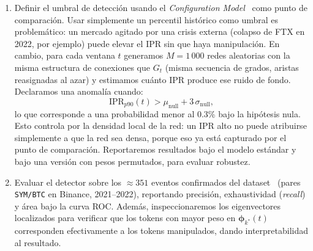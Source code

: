 \begin{enumerate}
  \item Definir el umbral de detección usando el \emph{Configuration
        Model}~\cite{newman2003} como punto de comparación. Usar simplemente
        un percentil histórico como umbral es problemático: un mercado agitado
        por una crisis externa (colapso de FTX en 2022, por ejemplo) puede
        elevar el IPR sin que haya manipulación. En cambio, para cada ventana
        $t$ generamos $M = 1\,000$ redes aleatorias con la misma estructura de
        conexiones que $G_t$ (misma secuencia de grados, aristas reasignadas al
        azar) y estimamos cuánto IPR produce ese ruido de fondo. Declaramos
        una anomalía cuando:
        \begin{equation}
          \mathrm{IPR}_{p90}(t) > \mu_{\text{null}} + 3\,\sigma_{\text{null}},
          \label{eq:threshold}
        \end{equation}
        lo que corresponde a una probabilidad menor al 0.3\% bajo la hipótesis
        nula. Esto controla por la densidad local de la red: un IPR alto no
        puede atribuirse simplemente a que la red sea densa, porque eso ya
        está capturado por el punto de comparación. Reportaremos resultados
        bajo el modelo estándar y bajo una versión con pesos permutados, para
        evaluar robustez.

  \item Evaluar el detector sobre los ${\approx}351$ eventos confirmados del
        dataset~\cite{lamorgia2020} (pares \texttt{SYM/BTC} en Binance,
        2021--2022), reportando precisión, exhaustividad (\emph{recall}) y
        área bajo la curva ROC. Además, inspeccionaremos los eigenvectores
        localizados para verificar que los tokens con mayor peso en
        $\boldsymbol{\phi}_{k^*}(t)$ corresponden efectivamente a los tokens
        manipulados, dando interpretabilidad al resultado.

\end{enumerate}
